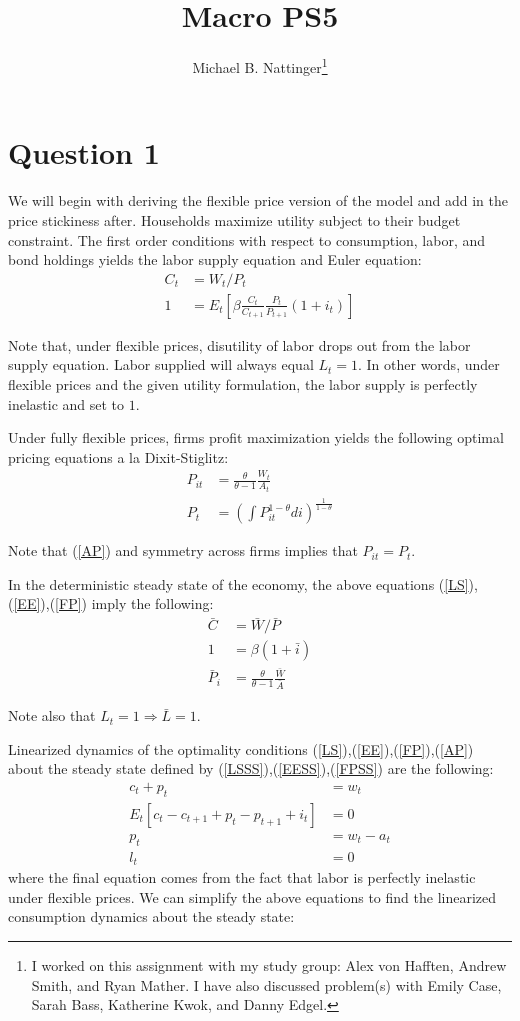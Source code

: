 \documentclass[11pt]{article} %
\title{Macro PS5}
\author{Michael B. Nattinger\footnote{I worked on this assignment with my study group: Alex von Hafften, Andrew Smith, and Ryan Mather. I have also discussed problem(s) with Emily Case, Sarah Bass, Katherine Kwok, and Danny Edgel.}}
\begin{document}
\maketitle
\section{Question 1}
We will begin with deriving the flexible price version of the model and add in the price stickiness after. Households maximize utility subject to their budget constraint. The first order conditions with respect to consumption, labor, and bond holdings yields the labor supply equation and Euler equation:
\begin{align}
C_t &= W_t/P_t \label{LS}\\
1 &= E_t\left[ \beta \frac{C_t}{C_{t+1}} \frac{P_t}{P_{t+1}} (1+i_t) \right] \label{EE}
\end{align}

Note that, under flexible prices, disutility of labor drops out from the labor supply equation. Labor supplied will always equal $L_t = 1$. In other words, under flexible prices and the given utility formulation, the labor supply is perfectly inelastic and set to $1$.

Under fully flexible prices, firms profit maximization yields the following optimal pricing equations a la Dixit-Stiglitz:
\begin{align}
P_{it} &= \frac{\theta}{\theta - 1}\frac{W_t}{A_{t}} \label{FP}\\
P_{t} &= \left(\int P_{it}^{1-\theta } di \right)^{\frac{1}{1-\theta}} \label{AP}
\end{align}

Note that (\ref{AP}) and symmetry across firms implies that $P_{it} = P_t$.

In the deterministic steady state of the economy, the above equations (\ref{LS}),(\ref{EE}),(\ref{FP}) imply the following:
\begin{align}
\bar{C} &= \bar{W}/\bar{P} \label{LSSS}\\
1 &= \beta(1+\bar{i}) \label{EESS}\\
\bar{P}_{i} &= \frac{\theta}{\theta - 1}\frac{\bar{W}}{\bar{A}} \label{FPSS}
\end{align}

Note also that $L_t = 1 \Rightarrow \bar{L} = 1$.

Linearized dynamics of the optimality conditions  (\ref{LS}),(\ref{EE}),(\ref{FP}),(\ref{AP}) about the steady state defined by  (\ref{LSSS}),(\ref{EESS}),(\ref{FPSS}) are the following:
\begin{align*}
c_t + p_t &= w_t\\
 E_t[c_t - c_{t+1} + p_t - p_{t+1} +i_t] &= 0 \\
p_{t} &= w_t - a_t \\
l_t &= 0
\end{align*}
where the final equation comes from the fact that labor is perfectly inelastic under flexible prices. We can simplify the above equations to find the linearized consumption dynamics about the steady state:
\end{document}
